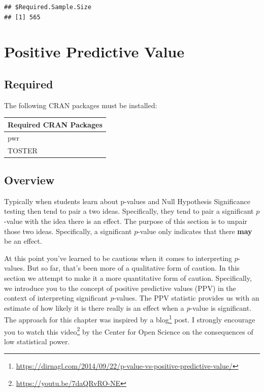 \documentclass[
]{krantz}
\renewcommand{\href}[2]{#2\footnote{\url{#1}}}
\begin{document}
\begin{verbatim}
## $Required.Sample.Size
## [1] 565
\end{verbatim}

\hypertarget{positive-predictive-value}{%
\chapter{Positive Predictive Value}\label{positive-predictive-value}}

\hypertarget{required-7}{%
\section{Required}\label{required-7}}

The following CRAN packages must be installed:

\begin{longtable}[]{@{}l@{}}
\toprule
Required CRAN Packages \\
\midrule
\endhead
pwr \\
TOSTER \\
\bottomrule
\end{longtable}

\hypertarget{overview-6}{%
\section{Overview}\label{overview-6}}

Typically when students learn about p-values and Null Hypothesis Significance testing then tend to pair a two ideas. Specifically, they tend to pair a significant \(p\)-value with the idea there is an effect. The purpose of this section is to unpair those two ideas. Specifically, a significant \(p\)-value only indicates that there \textbf{may} be an effect.

At this point you've learned to be cautious when it comes to interpreting \(p\)-values. But so far, that's been more of a qualitative form of caution. In this section we attempt to make it a more quantitative form of caution. Specifically, we introduce you to the concept of positive predictive values (PPV) in the context of interpreting significant \emph{p}-values. The PPV statistic provides us with an estimate of how likely it is there really is an effect when a \emph{p}-value is significant. The approach for this chapter was inspired by a \href{https://dirnagl.com/2014/09/22/p-value-vs-positive-predictive-value/}{blog} post. I strongly encourage you to watch \href{https://youtu.be/7daQRvRO-NE}{this video} by the Center for Open Science on the consequences of low statistical power.
\end{document}
